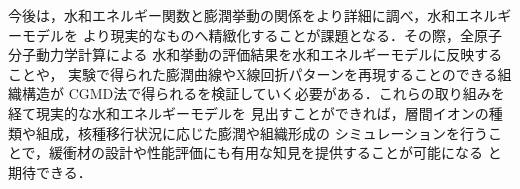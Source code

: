 ﻿\documentclass[11pt,a4j]{jarticle}
\begin{document}
今後は，水和エネルギー関数と膨潤挙動の関係をより詳細に調べ，水和エネルギーモデルを
より現実的なものへ精緻化することが課題となる．その際，全原子分子動力学計算による
水和挙動の評価結果を水和エネルギーモデルに反映することや，
実験で得られた膨潤曲線やX線回折パターンを再現することのできる組織構造が
CGMD法で得られるを検証していく必要がある．これらの取り組みを経て現実的な水和エネルギーモデルを
見出すことができれば，層間イオンの種類や組成，核種移行状況に応じた膨潤や組織形成の
シミュレーションを行うことで，緩衝材の設計や性能評価にも有用な知見を提供することが可能になる
と期待できる．
%
\end{document}
